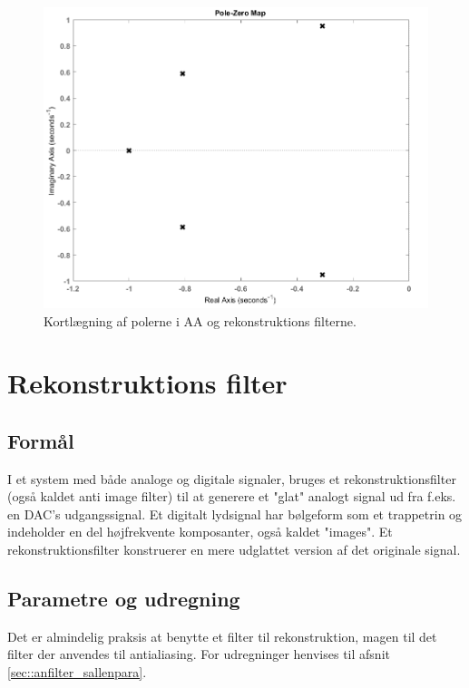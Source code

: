 \begin{figure}[h!]
	\centering
	\includegraphics[scale = 0.35]{./billeder/pzmap}
	\caption{Kortlægning af polerne i AA og rekonstruktions filterne.}
	\label{fig::anfilter_pol}
\end{figure}
\FloatBlock
\section{Rekonstruktions filter}
\subsection{Formål}
I et system med både analoge og digitale signaler, bruges et rekonstruktionsfilter (også kaldet anti image filter) til at generere et "glat"  analogt signal ud fra f.eks. en DAC's udgangssignal. Et digitalt lydsignal har bølgeform som et trappetrin og indeholder en del højfrekvente komposanter, også kaldet "images". Et rekonstruktionsfilter konstruerer en mere udglattet version af det originale signal.
\subsection{Parametre og udregning}
Det er almindelig praksis at benytte et filter til rekonstruktion, magen til det filter der anvendes til antialiasing. For udregninger henvises til afsnit \ref{sec::anfilter_sallenpara}.

